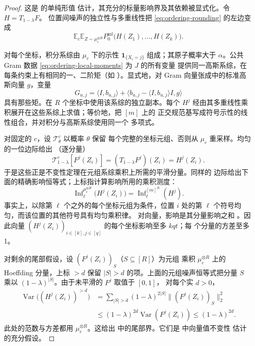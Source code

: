 \begin{proof}
这是 \cite[Lemma~10.5]{GuruswamiEtAl2011OrderingCSP} 的单纯形值
估计，其充分的标量影响界及其依赖被显式化。令 \(H=T_{1-\lambda}F\)。
位置间噪声的独立性与多重线性把
\eqref{eq:ordering-rounding} 的左边变成
\begin{equation}
 \mathbb E_c\mathbb E_{Z\sim\mu_c^{\otimes R}}
 P_0^{\mathrm{ml}}\bigl(H(Z_1),\ldots,H(Z_k)\bigr).
\label{eq:ordering-noise-factorization}
\end{equation}

对每个坐标，积分系综由 \(\mu_c\) 下的示性
\(\mathbf1_{\{X_i=j\}}\) 组成；其原子概率大于 \(\alpha\)。公共
Gram 数据 \eqref{eq:ordering-local-moments} 为 \(J\) 的所有变量
提供同一高斯系综，在每条约束上有相同的一、二阶矩（如
\cite[Lemma~10.4]{GuruswamiEtAl2011OrderingCSP}）。显式地，对 Gram
向量张成中的标准高斯向量 \(g\)，变量
\[
 G_{u,j}=\langle I,b_{u,j}\rangle+
   \langle b_{u,j}-\langle I,b_{u,j}\rangle I,g\rangle
\]
具有那些矩。在 \(R\) 个坐标中使用该系综的独立副本。每个 \(H^j\)
经由其多重线性乘积展开在这些系综上求值；等价地，把 \([m]\) 上的
正交规范基写成符号示性的线性组合，并对积分与高斯系综使用同一个
多项式。

对固定的 \(c\)，设 \(\mathcal T_\theta^c\) 以概率 \(\theta\) 保留
每个完整的坐标元组、否则从 \(\mu_c\) 重采样。均匀的一位边际给出
（逐分量）
\[
 \mathcal T_{1-\lambda}^c[F^j(Z_i)]
 =(T_{1-\lambda}F^j)(Z_i)=H^j(Z_i).
\]
于是这些正是不变性定理在元组系综乘积上所需的平滑分量。同样的
边际给出下面的精确影响恒等式；上标指计算影响所用的乘积测度：
\begin{equation}
 \operatorname{Inf}^{\mu_c^{\otimes R}}_\ell
       \bigl(H^j(Z_i)\bigr)
 =
 \operatorname{Inf}^{[m]^R}_\ell(H^j).
\label{eq:ordering-vector-influence}
\end{equation}
事实上，以除第 \(\ell\) 个之外的每个坐标元组为条件，位置 \(i\)
处的第 \(\ell\) 个符号均匀，而该位置的其他符号具有均匀乘积律。
对向量，影响是其分量影响之和
\cite[Definition~2.6]{IsakssonMossel2009}。因此向量
\((H^j(Z_i))_{i\in[k],j\in[q]}\) 的每个坐标影响至多 \(kqt\)；每
个分量的方差至多 1。

对剩余的尾部假设，设 \((F^j(Z_i))_S\)（\(S\subseteq[R]\)）为元组
乘积 \(\mu_c^{\otimes R}\) 上的 Hoeffding 分量，上标 \(>d\) 保留
\(|S|>d\) 的项。上面的元组噪声恒等式把分量 \(S\) 乘以
\((1-\lambda)^{|S|}\)。由于未平滑的 \(F^j\) 取值于 \([0,1]\)，
对每个实 \(d>0\)，
\[
\begin{aligned}
 \operatorname{Var}\bigl((H^j(Z_i))^{>d}\bigr)
 &=\sum_{|S|>d}(1-\lambda)^{2|S|}
       \bigl\|(F^j(Z_i))_S\bigr\|_2^2\\
 &\le (1-\lambda)^{2d}\operatorname{Var}(F^j(Z_i))
 \le (1-\lambda)^{2d}.
\end{aligned}
\]
此处的范数与方差都用 \(\mu_c^{\otimes R}\)。这给出
\cite[Theorem~3.6]{IsakssonMossel2009} 中的尾部界。它们是
\cite[Theorem~10.1]{GuruswamiEtAl2011OrderingCSP} 中向量值不变性
估计的充分假设。


\end{proof}
